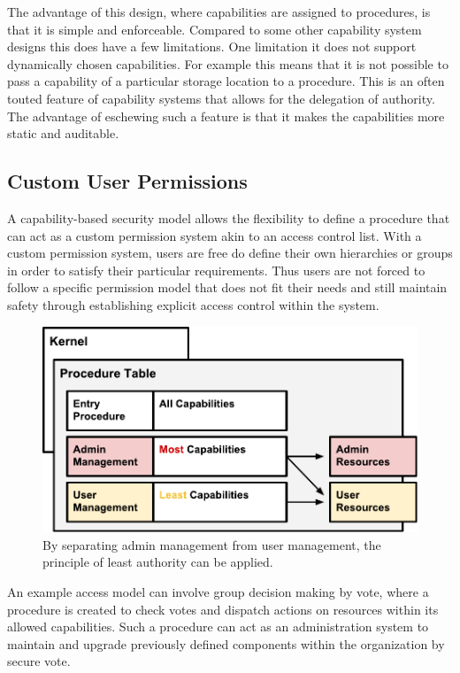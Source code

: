 \documentclass[english,a4paper]{article}
\begin{document}
The advantage of this design, where capabilities are assigned to
procedures, is that it is simple and enforceable. Compared to some other
capability system designs this does have a few limitations. One
limitation it does not support dynamically chosen capabilities. For
example this means that it is not possible to pass a capability of a
particular storage location to a procedure. This is an often touted
feature of capability systems that allows for the delegation of
authority. The advantage of eschewing such a feature is that it makes
the capabilities more static and auditable.

\subsection{Custom User Permissions}\label{custom-user-permissions}
A capability-based security model allows the flexibility to define a
procedure that can act as a custom permission system akin to an access
control list. With a custom permission system, users are free do define
their own hierarchies or groups in order to satisfy their particular
requirements. Thus users are not forced to follow a specific permission
model that does not fit their needs and still maintain safety through
establishing explicit access control within the system.

\begin{figure}[htbp]
\centering
\includegraphics[width=1\textwidth]{media/Separation.pdf}
\caption{By separating admin management from user management, the
principle of least authority can be applied.}
\end{figure}

An example access model can involve group decision making by vote, where
a procedure is created to check votes and dispatch actions on resources
within its allowed capabilities. Such a procedure can act as an
administration system to maintain and upgrade previously defined
components within the organization by secure vote.
\end{document}
